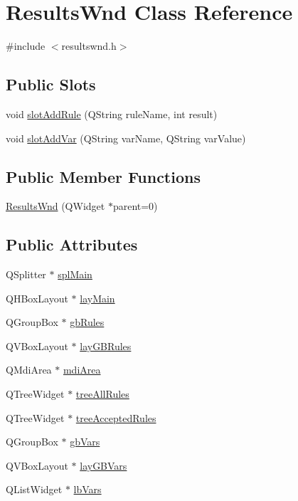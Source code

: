 \hypertarget{class_results_wnd}{
\section{ResultsWnd Class Reference}
\label{class_results_wnd}
}


{\ttfamily \#include $<$resultswnd.h$>$}

\subsection*{Public Slots}
\begin{DoxyCompactItemize}
\item 
void \hyperlink{class_results_wnd_a17c309583fb0b08fc11d03a8df871dbd}{slotAddRule} (QString ruleName, int result)
\item 
void \hyperlink{class_results_wnd_aca19214aa74a0bd62d9e259ab388e3ed}{slotAddVar} (QString varName, QString varValue)
\end{DoxyCompactItemize}
\subsection*{Public Member Functions}
\begin{DoxyCompactItemize}
\item 
\hyperlink{class_results_wnd_ace372d2024f4725eb37309a8f4e48543}{ResultsWnd} (QWidget $\ast$parent=0)
\end{DoxyCompactItemize}
\subsection*{Public Attributes}
\begin{DoxyCompactItemize}
\item 
QSplitter $\ast$ \hyperlink{class_results_wnd_a83475f5a6de9e7a383949156ada3ed33}{splMain}
\item 
QHBoxLayout $\ast$ \hyperlink{class_results_wnd_abf4afd833f509af7f3c93ea41ca93aa2}{layMain}
\item 
QGroupBox $\ast$ \hyperlink{class_results_wnd_a456f3b5667e522c22698d577d8598a13}{gbRules}
\item 
QVBoxLayout $\ast$ \hyperlink{class_results_wnd_ac76243bda2e1042bd78f0132c0594544}{layGBRules}
\item 
QMdiArea $\ast$ \hyperlink{class_results_wnd_a2ea2e38ff2d1cede2920eddc2206e7ab}{mdiArea}
\item 
QTreeWidget $\ast$ \hyperlink{class_results_wnd_ac9d2948e6951234621b4e18de6031580}{treeAllRules}
\item 
QTreeWidget $\ast$ \hyperlink{class_results_wnd_ab1ea5f39deb1c1ae3787be670f6d6429}{treeAcceptedRules}
\item 
QGroupBox $\ast$ \hyperlink{class_results_wnd_ad5ef5a4b40bd661b7ff448504f0bfc54}{gbVars}
\item 
QVBoxLayout $\ast$ \hyperlink{class_results_wnd_af50780faade4a0f44f483b5d3d96b34b}{layGBVars}
\item 
QListWidget $\ast$ \hyperlink{class_results_wnd_a5cfc059bfc3c05694c9a04dad6f867b5}{lbVars}
\end{DoxyCompactItemize}


